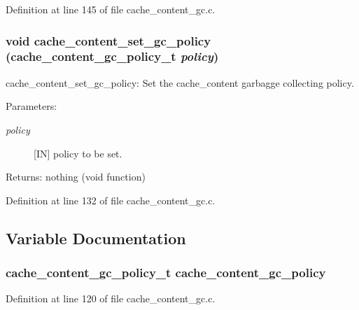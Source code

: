 Definition at line 145 of file cache\_\-content\_\-gc.c.
\subsubsection[{cache\_\-content\_\-set\_\-gc\_\-policy}]{\setlength{\rightskip}{0pt plus 5cm}void cache\_\-content\_\-set\_\-gc\_\-policy (cache\_\-content\_\-gc\_\-policy\_\-t {\em policy})}\label{cache__content__gc_8c_6b7f07f180776c9ff62f8b5330ae247b}


cache\_\-content\_\-set\_\-gc\_\-policy: Set the cache\_\-content garbagge collecting policy.

\begin{Desc}
\item[Parameters:]
\begin{description}
\item[{\em policy}][IN] policy to be set.\end{description}
\end{Desc}
\begin{Desc}
\item[Returns:]nothing (void function) \end{Desc}


Definition at line 132 of file cache\_\-content\_\-gc.c.

\subsection{Variable Documentation}
\subsubsection[{cache\_\-content\_\-gc\_\-policy}]{\setlength{\rightskip}{0pt plus 5cm}cache\_\-content\_\-gc\_\-policy\_\-t {\bf cache\_\-content\_\-gc\_\-policy}}\label{cache__content__gc_8c_ff0b79775409d0858d24af52abdcc2d5}




Definition at line 120 of file cache\_\-content\_\-gc.c.